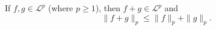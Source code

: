 If $f, g \in \mathcal{L}^p$ (where $p \geq 1$), then $f + g \in \mathcal{L}^p$ and
$$\|f + g\|_p \leq \|f\|_p + \|g\|_p.$$
